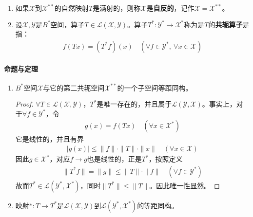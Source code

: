 \begin{enumerate}[leftmargin=2cm, label=\arabic*]
    \item 如果$\mathscr{X}$到$\mathscr{X}^{**}$的自然映射$T$是满射的，则称$\mathscr{X}$是\textbf{自反的}，记作$\mathscr{X} = \mathscr{X}^{**}$。

    \item 设$\mathscr{X},\mathscr{Y}$是$B^*$空间，算子$T\in\mathscr{L}(\mathscr{X},\mathscr{Y})$。算子$T^*:\mathscr{Y}^*\to\mathscr{X}^*$称为是$T$的\textbf{共轭算子}是指：
    \begin{align*}
        f(Tx) = (T^*f)(x) \quad (\forall f\in \mathscr{Y}^*,\ \forall x\in \mathscr{X})
    \end{align*}


    
    
\end{enumerate}

\paragraph{命题与定理}
\begin{enumerate}[leftmargin=2cm, label=\arabic*]
    \item $B^*$空间$\mathscr{X}$与它的第二共轭空间$\mathscr{X}^{**}$的一个子空间等距同构。
    \begin{proof}
        $\forall T\in\mathscr{L}(\mathscr{X},\mathscr{Y})$，$T^*$是唯一存在的，并且属于$\mathscr{L}(\mathscr{Y},\mathscr{X})$。事实上，对于$\forall f\in\mathscr{Y}^*$，令
        \begin{align*}
            g(x) = f(Tx)\quad (\forall x\in\mathscr{X}^*)
        \end{align*}
        它是线性的，并且有界
        \begin{align*}
            |g(x)| \leqslant \|f\|\cdot\|T\|\cdot\|x\| \quad (\forall x\in\mathscr{X})
        \end{align*}
        因此$g\in\mathscr{X}^*$，对应$f\to g$也是线性的，正是$T^*$，按照定义
        \begin{align*}
            \|T^*f\| = \|g\| \leqslant \|T\|\cdot \|f\| \quad (\forall f\in\mathscr{Y}^*)
        \end{align*}
        故而$T^*\in\mathscr{L}(\mathscr{Y}^*,\mathscr{X}^*)$，同时$\|T^*\|\leqslant \|T\|$。因此唯一性显然。        
    \end{proof}

    \item 映射$*:T\to T^*$是$\mathscr{L}(\mathscr{X},\mathscr{Y})$到$\mathscr{L}(\mathscr{Y}^*,\mathscr{X}^*)$的等距同构。
\end{enumerate}

